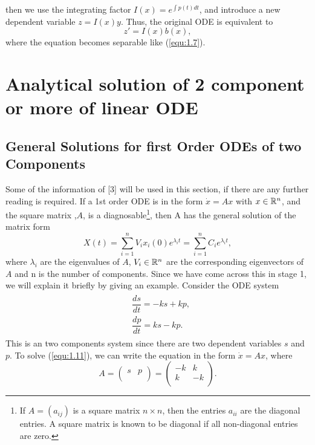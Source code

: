 \documentclass[a4paper]{report}
\theoremstyle{definition}
\begin{document}
then we use the integrating factor  $I(x)=e^{\int p(t)dt}$, and introduce a new dependent variable $z=I(x)y$. Thus, the original ODE is equivalent to 
\begin{equation}
\label{equ:1.9}
z'=I(x)b(x),
\end{equation} 
where the equation becomes separable like (\ref{equ:1.7}).

\section{Analytical solution of 2 component or more of linear ODE}

\subsection{General Solutions for first Order ODEs of two Components}
\label{General Solutions for first Order ODEs of two Components}
Some of the information of [3] will be used in this section, if there are any further reading is required.
If a 1st order ODE is in the form $\dot{x}=Ax$ with $x\in{\Bbb R^n}$, and the square matrix ,$A$, is a diagnosable\footnote{If $A = (a_{ij})$ is a square matrix $n \times n$, then the entries $a_{ii}$ are the diagonal entries. A square matrix is known to be diagonal if all non-diagonal entries are zero.}, then A has the general solution of the matrix form
\begin{equation}
X(t)=\sum_{i=1}^{n}V_i{x_i(0)e^{\lambda_i t}}=
\sum_{i=1}^{n}C_ie^{\lambda_i t},
\end{equation}
where $\lambda_i$ are the eigenvalues of $A$, $V_i\in{\Bbb R^n}$ are the corresponding eigenvectors of $A$ and n is the number of components. Since we have come across this in stage 1, we will explain it  briefly by giving an example. 
Consider the ODE system
\begin{align}
\begin{split}
\label{equ:1.11}
&\dfrac{ds}{dt}=-ks+kp,
\\
&\dfrac{dp}{dt}=ks-kp.
\end{split}
\end{align}
This is an two components system since there are two dependent variables $s$ and $p$.
To solve (\ref{equ:1.11}), we can write the equation in the form $\dot{x}=Ax$, where 
\begin{equation}
A = 
\left(
\begin{array}{cc}
s & p\\

\end{array}
\right)=
\left(
\begin{array}{cc}
-k & k\\
k & -k\\
\end{array}
\right).
\end{equation}
\end{document}
